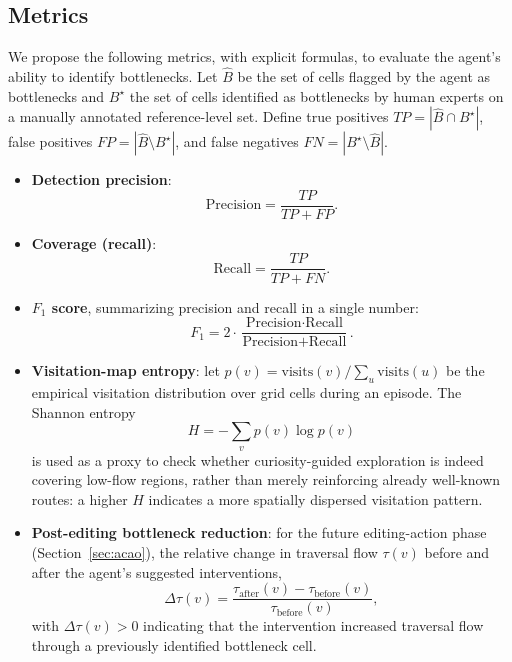 \documentclass[sigconf,nonacm,language=english]{acmart}
\begin{document}
\subsection{Metrics}

We propose the following metrics, with explicit formulas, to evaluate the
agent's ability to identify bottlenecks. Let $\hat{B}$ be the set of cells
flagged by the agent as bottlenecks and $B^\star$ the set of cells
identified as bottlenecks by human experts on a manually annotated
reference-level set. Define true positives $TP = |\hat{B} \cap B^\star|$,
false positives $FP = |\hat{B} \setminus B^\star|$, and false negatives
$FN = |B^\star \setminus \hat{B}|$.

\begin{itemize}
  \item \textbf{Detection precision}:
  \begin{equation}
    \text{Precision} = \frac{TP}{TP + FP}.
    \label{eq:precision}
  \end{equation}

  \item \textbf{Coverage (recall)}:
  \begin{equation}
    \text{Recall} = \frac{TP}{TP + FN}.
    \label{eq:recall}
  \end{equation}

  \item \textbf{$F_1$ score}, summarizing precision and recall in a single
    number:
  \begin{equation}
    F_1 = 2 \cdot \frac{\text{Precision} \cdot \text{Recall}}
      {\text{Precision} + \text{Recall}}.
    \label{eq:f1}
  \end{equation}

  \item \textbf{Visitation-map entropy}: let $p(v) = \text{visits}(v) /
    \sum_{u} \text{visits}(u)$ be the empirical visitation distribution
    over grid cells during an episode. The Shannon entropy
  \begin{equation}
    H = -\sum_{v} p(v) \log p(v)
    \label{eq:entropy}
  \end{equation}
    is used as a proxy to check whether curiosity-guided exploration is
    indeed covering low-flow regions, rather than merely reinforcing
    already well-known routes: a higher $H$ indicates a more spatially
    dispersed visitation pattern.

  \item \textbf{Post-editing bottleneck reduction}: for the future editing-action
    phase (Section~\ref{sec:acao}), the relative change in traversal flow
    $\tau(v)$ before and after the agent's suggested interventions,
  \begin{equation}
    \Delta\tau(v) = \frac{\tau_{\text{after}}(v) - \tau_{\text{before}}(v)}
      {\tau_{\text{before}}(v)},
    \label{eq:delta-tau}
  \end{equation}
    with $\Delta\tau(v) > 0$ indicating that the intervention increased
    traversal flow through a previously identified bottleneck cell.
\end{itemize}
\end{document}
